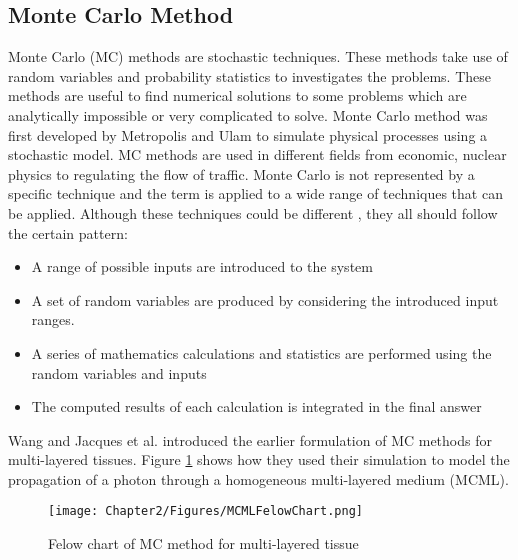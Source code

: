 \subsection{Monte Carlo Method}
Monte Carlo (MC) methods are stochastic techniques. These methods take use of random variables and probability statistics to investigates the problems. These methods are useful to find numerical solutions to some problems which are analytically impossible or very complicated to solve. Monte Carlo method was first developed by Metropolis and Ulam \cite{metropolis1949monte} to simulate physical processes using a stochastic model. MC methods are used in different fields from economic, nuclear physics to regulating the flow of traffic. Monte Carlo is not represented by a specific technique and the term is applied to a wide range of techniques that can be applied. Although these techniques could be different , they all should follow the certain pattern:  

	\begin{itemize}
	\item A range of possible inputs are introduced to the system
	\item A set of random variables are produced by considering the introduced input ranges. 
	\item A series of mathematics calculations and statistics are performed using the random variables and inputs	
	\item The computed results of each calculation is integrated in the final answer
	\end{itemize}


Wang and Jacques et al. \cite{wang1992monte} introduced the earlier formulation of MC methods for multi-layered tissues. Figure \ref{fig:MC-Jacques} shows how they used their simulation to model the propagation of a photon through a homogeneous multi-layered medium (MCML).
	\begin{figure}[h]
	\centering 
	\texttt{[image: Chapter2/Figures/MCMLFelowChart.png]}	
	\caption{Felow chart of MC method for multi-layered tissue \cite{wang1992monte}}
	\label{fig:MC-Jacques}
	\end{figure} 
	
